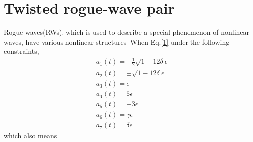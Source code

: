 \documentclass[12pt]{article}
\begin{document}
\section{Twisted rogue-wave pair}
Rogue waves(RWs), which is used to describe a special phenomenon of nonlinear waves, have various nonlinear structures. When Eq.\eqref{1} under the following constraints,
\begin{align}
  & a_{1}(t) = \pm\frac{1}{2}\sqrt{1-12\delta}\epsilon \\
  & a_{2}(t) = \pm\sqrt{1-12\delta}\epsilon \\
  & a_{3}(t) = \epsilon \\
  & a_{4}(t) = 6\epsilon \\
  & a_{5}(t) = -3\epsilon \\
  & a_{6}(t) = \gamma \epsilon \\
  & a_{7}(t) = \delta \epsilon
\end{align}
which also means $$
\end{document}
